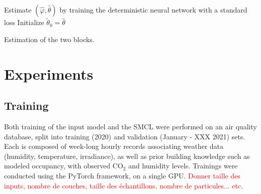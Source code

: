 \documentclass{article}
\begin{document}

\begin{algorithm}
Estimate $(\widehat\varphi,\widehat\theta)$ by training the deterministic neural network with a standard loss\;
Initialize $\widetilde \theta_0 = \widehat \theta$\;
	\caption{Estimation of the two blocks.}
	\label{algo:allsteps}
\end{algorithm}


\section{Experiments}
\label{sec:exp}

\subsection{Training}%
\label{sub:training}
Both training of the input model and the SMCL were performed on an air quality database, split into training (2020) and validation (January - XXX 2021) sets.
Each is composed of week-long hourly records associating weather data (humidity, temperature, irradiance), as well as prior building knowledge such as modeled occupancy, with observed \ensuremath{\mathrm{CO_2}} and humidity levels.
Trainings were conducted using the PyTorch framework, on a single GPU.
\textcolor{red}{Donner taille des inputs, nombre de couches, taille des échantillons, nombre de particules... etc.}
\end{document}

